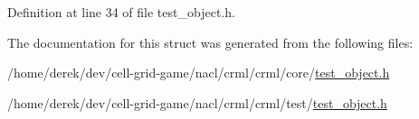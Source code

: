 Definition at line 34 of file test\_\-object.h.



The documentation for this struct was generated from the following files:\begin{DoxyCompactItemize}
\item 
/home/derek/dev/cell-\/grid-\/game/nacl/crml/crml/core/\hyperlink{core_2test__object_8h}{test\_\-object.h}\item 
/home/derek/dev/cell-\/grid-\/game/nacl/crml/crml/test/\hyperlink{test_2test__object_8h}{test\_\-object.h}\end{DoxyCompactItemize}
